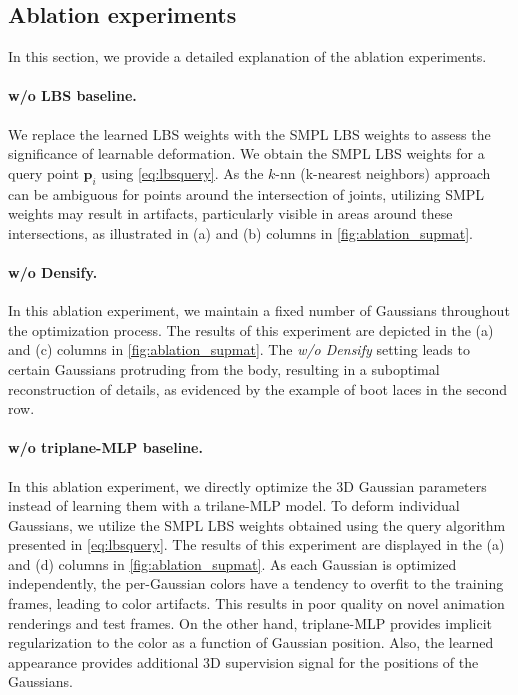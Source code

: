 \subsection{Ablation experiments}


In this section, we provide a detailed explanation of the ablation experiments.

\paragraph{w/o LBS baseline.} We replace the learned LBS weights with the SMPL LBS weights to assess the significance of learnable deformation. We obtain the SMPL LBS weights for a query point $\bm{p}_i$ using \cref{eq:lbsquery}. As the $k$-nn (k-nearest neighbors) approach can be ambiguous for points around the intersection of joints, utilizing SMPL weights may result in artifacts, particularly visible in areas around these intersections, as illustrated in (a) and (b) columns in \cref{fig:ablation_supmat}.

\paragraph{w/o Densify.} In this ablation experiment, we maintain a fixed number of Gaussians throughout the optimization process. The results of this experiment are depicted in the (a) and (c) columns in \cref{fig:ablation_supmat}. The \textit{w/o Densify} setting leads to certain Gaussians protruding from the body, resulting in a suboptimal reconstruction of details, as evidenced by the example of boot laces in the second row.

\paragraph{w/o triplane-MLP baseline.} In this ablation experiment, we directly optimize the 3D Gaussian parameters instead of learning them with a trilane-MLP model. To deform individual Gaussians, we utilize the SMPL LBS weights obtained using the query algorithm presented in \cref{eq:lbsquery}. The results of this experiment are displayed in the (a) and (d) columns in \cref{fig:ablation_supmat}. As each Gaussian is optimized independently, the per-Gaussian colors have a tendency to overfit to the training frames, leading to color artifacts. This results in poor quality on novel animation renderings and test frames. On the other hand, triplane-MLP provides implicit regularization to the color as a function of Gaussian position. Also, the learned appearance provides additional 3D supervision signal for the positions of the Gaussians.

